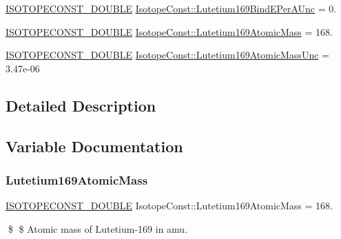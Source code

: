 \begin{DoxyCompactItemize}
\mbox{\hyperlink{group___isotope_const-_macros_ga8f45a7272ce02c0b4c65c44636ed719a}{I\+S\+O\+T\+O\+P\+E\+C\+O\+N\+S\+T\+\_\+\+D\+O\+U\+B\+LE}} \mbox{\hyperlink{group___isotope_const-_lutetium-_lu169_ga81b8498ec3fb01fb2afe66ea395ced13}{Isotope\+Const\+::\+Lutetium169\+Bind\+E\+Per\+A\+Unc}} = 0.
\item 
\mbox{\hyperlink{group___isotope_const-_macros_ga8f45a7272ce02c0b4c65c44636ed719a}{I\+S\+O\+T\+O\+P\+E\+C\+O\+N\+S\+T\+\_\+\+D\+O\+U\+B\+LE}} \mbox{\hyperlink{group___isotope_const-_lutetium-_lu169_gae73a753a83a13385e1044032c2cc01ea}{Isotope\+Const\+::\+Lutetium169\+Atomic\+Mass}} = 168.
\item 
\mbox{\hyperlink{group___isotope_const-_macros_ga8f45a7272ce02c0b4c65c44636ed719a}{I\+S\+O\+T\+O\+P\+E\+C\+O\+N\+S\+T\+\_\+\+D\+O\+U\+B\+LE}} \mbox{\hyperlink{group___isotope_const-_lutetium-_lu169_gaa17af3758cf2d86f4ff404d904b852b9}{Isotope\+Const\+::\+Lutetium169\+Atomic\+Mass\+Unc}} = 3.\+47e-\/06
\end{DoxyCompactItemize}


\subsection{Detailed Description}


\subsection{Variable Documentation}
\mbox{\label{group___isotope_const-_lutetium-_lu169_gae73a753a83a13385e1044032c2cc01ea}} 
\subsubsection{\texorpdfstring{Lutetium169\+Atomic\+Mass}{Lutetium169AtomicMass}}
{\footnotesize\ttfamily \mbox{\hyperlink{group___isotope_const-_macros_ga8f45a7272ce02c0b4c65c44636ed719a}{I\+S\+O\+T\+O\+P\+E\+C\+O\+N\+S\+T\+\_\+\+D\+O\+U\+B\+LE}} Isotope\+Const\+::\+Lutetium169\+Atomic\+Mass = 168.}

\$ \$ Atomic mass of Lutetium-\/169 in amu. \mbox{\label{group___isotope_const-_lutetium-_lu169_gaa17af3758cf2d86f4ff404d904b852b9}} 
